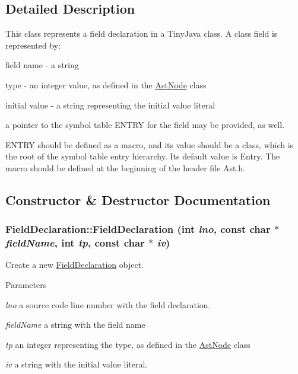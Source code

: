 \subsection{Detailed Description}
This class represents a field declaration in a TinyJava class. A class field is represented by:
\begin{DoxyItemize}
\item field name -\/ a string
\item type -\/ an integer value, as defined in the \hyperlink{classAstNode}{AstNode} class
\item initial value -\/ a string representing the initial value literal
\item a pointer to the symbol table ENTRY for the field may be provided, as well.
\end{DoxyItemize}

ENTRY should be defined as a macro, and its value should be a class, which is the root of the symbol table entry hierarchy. Its default value is Entry. The macro should be defined at the beginning of the header file Ast.h. 

\subsection{Constructor \& Destructor Documentation}
\hypertarget{classFieldDeclaration_ae9f21a335682f2c26688c8edaf9881e6}{
\subsubsection[{FieldDeclaration}]{\setlength{\rightskip}{0pt plus 5cm}FieldDeclaration::FieldDeclaration (int {\em lno}, \/  const char $\ast$ {\em fieldName}, \/  int {\em tp}, \/  const char $\ast$ {\em iv})}}
\label{classFieldDeclaration_ae9f21a335682f2c26688c8edaf9881e6}
Create a new \hyperlink{classFieldDeclaration}{FieldDeclaration} object.


\begin{DoxyParams}{Parameters}
\item[{\em lno}]a source code line number with the field declaration. \item[{\em fieldName}]a string with the field name \item[{\em tp}]an integer representing the type, as defined in the \hyperlink{classAstNode}{AstNode} class \item[{\em iv}]a string with the initial value literal. \end{DoxyParams}

